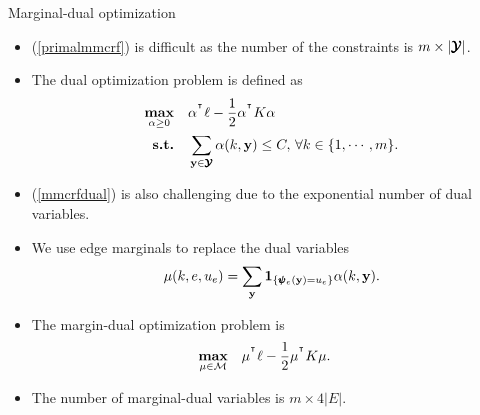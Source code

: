 \documentclass[first=dgreen,second=purple,logo=red]{aaltoslides}
\begin{document}
%
\begin{frame}{Marginal-dual optimization}
	\begin{itemize}\footnotesize
		\item (\ref{primalmmcrf}) is difficult as the number of the constraints is $m\times|\pmb {\mathcal{Y}}|$.
		\item The dual optimization problem is defined as
		\begin{align}
			\underset{\mathbf {\alpha}\ge0}{\textbf{max}} & \quad \mathbf {\alpha}^{^{\intercal}}\mathbf {\ell} - \frac{1}{2}\mathbf {\alpha}^{^{\intercal}}K\mathbf {\alpha}\label{mmcrfdual}\\
			\textbf{s.t.} & \quad \sum_{\mathbf {y}\in\pmb {\mathcal{Y}}}\alpha(k,\mathbf {y})\le C, \, \forall k\in\{1,\cdots,m\}\nonumber.
		\end{align}
		\item (\ref{mmcrfdual}) is also challenging due to the exponential number of dual variables.
		\item We use edge marginals to replace the dual variables \cite{Taskar04max}
		\begin{align*}
			\mu(k,e,u_e) = \sum_{\mathbf {y}}\mathbf{1}_{\{\pmb \psi_e(\mathbf {y})=u_e\}}\alpha(k,\mathbf {y}). 
		\end{align*}
		\item The margin-dual optimization problem is 
		\begin{align}
			\underset{\mathbf {\mu}\in\mathcal{M}}{\textbf{max}} & \quad \mathbf {\mu}^{^{\intercal}}\ell - \frac{1}{2}\mathbf {\mu}^{^{\intercal}}K\mathbf {\mu}. \label{mmcrfmarginaldual}
		\end{align}
		\item The number of marginal-dual variables is $m\times4|E|$.
	\end{itemize}
\end{frame}
\end{document}
